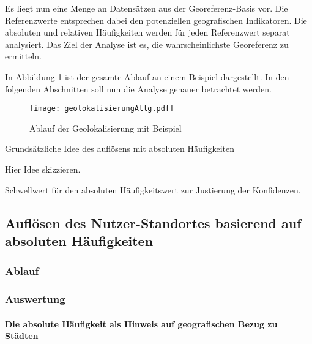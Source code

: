 		Es liegt nun eine Menge an Datensätzen aus der Georeferenz-Basis vor.
		Die Referenzwerte entsprechen dabei den potenziellen geografischen Indikatoren.
		Die absoluten und relativen Häufigkeiten werden für jeden Referenzwert separat analysiert.
		Das Ziel der Analyse ist es, die wahrscheinlichste Georeferenz zu ermitteln.

		In Abbildung \ref{img:ablaufGeolok} ist der gesamte Ablauf an einem Beispiel dargestellt.
		In den folgenden Abschnitten soll nun die Analyse genauer betrachtet werden.

			\begin{figure} 
			\begin{center}
						\texttt{[image: geolokalisierungAllg.pdf]}
						\caption{Ablauf der Geolokalisierung mit Beispiel}
						\label{img:ablaufGeolok}
					\end{center}
			\end{figure}	

		Grundsätzliche Idee des auflösens mit absoluten Häufigkeiten

		Hier Idee skizzieren. 

			Schwellwert für den absoluten Häufigkeitswert zur Justierung der Konfidenzen.

		\subsection{Auflösen des Nutzer-Standortes basierend auf absoluten Häufigkeiten} 

			\subsubsection{Ablauf}

			\subsubsection{Auswertung}  

				\paragraph{Die absolute Häufigkeit als Hinweis auf geografischen Bezug zu Städten} 
				
